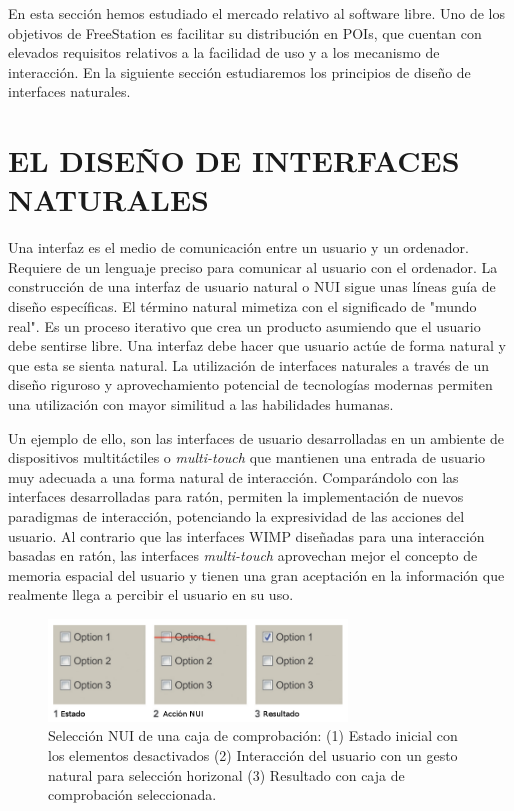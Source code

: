 En esta sección hemos estudiado el mercado relativo al software libre. Uno de
los objetivos de FreeStation es facilitar su distribución en POIs, que cuentan
con elevados requisitos relativos a la facilidad de uso y a los mecanismo de
interacción. En la siguiente sección estudiaremos los principios de diseño de
interfaces naturales.

\section{\uppercase{El diseño de interfaces naturales}}
\label{sec:interfazNUI}
Una interfaz es el medio de comunicación entre un usuario y un ordenador.
Requiere de un lenguaje preciso para comunicar al usuario con el
ordenador. La construcción de una interfaz de usuario natural o
\acs{NUI}\label{acro:NUI} sigue unas líneas guía de diseño específicas. El
término natural mimetiza con el significado de "mundo real". Es un proceso
iterativo que crea un producto asumiendo que el usuario debe sentirse 
libre. Una interfaz debe hacer que usuario actúe de forma natural y que esta
se sienta natural. La utilización de interfaces naturales a través de un diseño
riguroso y aprovechamiento potencial de tecnologías modernas permiten una utilización con
mayor similitud a las habilidades humanas.

Un ejemplo de ello, son las interfaces de usuario desarrolladas en un ambiente
de dispositivos multitáctiles o \emph{multi-touch} que mantienen una entrada de 
usuario muy adecuada a una forma natural de interacción.
Comparándolo con las interfaces desarrolladas para ratón, permiten la
implementación de nuevos paradigmas de interacción, potenciando la expresividad
de las acciones del usuario. Al contrario que las interfaces
\acs{WIMP}\label{acro:WIMP} diseñadas para una interacción basadas en ratón, las interfaces \emph{multi-touch} aprovechan mejor
el concepto de memoria espacial del usuario y tienen una gran aceptación en la
información que realmente llega a percibir el usuario en su uso.

\begin{figure}[ht]
    \begin{center}
        \includegraphics[width=300px]{src/img/check-buttons-state1.png}
        \caption[Ejemplo 1 interacción con interfaz NUI]
        {Selección NUI de una caja de comprobación: (1) Estado inicial con los elementos
        desactivados (2) Interacción del usuario con un gesto
        natural para selección horizonal (3) Resultado con caja de
        comprobación seleccionada.}
        \label{fig:NUI1}
    \end{center}
\end{figure}

